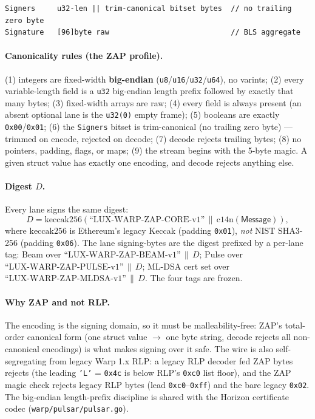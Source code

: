 \documentclass[11pt,a4paper]{article}
\begin{document}
\begin{lstlisting}
Signers     u32-len || trim-canonical bitset bytes  // no trailing zero byte
Signature   [96]byte raw                            // BLS aggregate
\end{lstlisting}

\paragraph{Canonicality rules (the ZAP profile).} (1) integers are fixed-width \textbf{big-endian} (\texttt{u8}/\texttt{u16}/\texttt{u32}/\texttt{u64}), no varints; (2) every variable-length field is a \texttt{u32} big-endian length prefix followed by exactly that many bytes; (3) fixed-width arrays are raw; (4) every field is always present (an absent optional lane is the \texttt{u32(0)} empty frame); (5) booleans are exactly \texttt{0x00}/\texttt{0x01}; (6) the \texttt{Signers} bitset is trim-canonical (no trailing zero byte) --- trimmed on encode, rejected on decode; (7) decode rejects trailing bytes; (8) no pointers, padding, flags, or maps; (9) the stream begins with the 5-byte magic. A given struct value has exactly one encoding, and decode rejects anything else.

\paragraph{Digest $D$.} Every lane signs the same digest:
\[
  D = \mathrm{keccak256}(\text{``LUX-WARP-ZAP-CORE-v1''} \,\|\, \mathrm{c14n}(\mathsf{Message})),
\]
where $\mathrm{keccak256}$ is Ethereum's legacy Keccak (padding \texttt{0x01}), \emph{not} NIST SHA3-256 (padding \texttt{0x06}). The lane signing-bytes are the digest prefixed by a per-lane tag: Beam over $\text{``LUX-WARP-ZAP-BEAM-v1''}\,\|\,D$; Pulse over $\text{``LUX-WARP-ZAP-PULSE-v1''}\,\|\,D$; ML-DSA cert set over $\text{``LUX-WARP-ZAP-MLDSA-v1''}\,\|\,D$. The four tags are frozen.

\paragraph{Why ZAP and not RLP.} The encoding is the signing domain, so it must be malleability-free: ZAP's total-order canonical form (one struct value $\to$ one byte string, decode rejects all non-canonical encodings) is what makes signing over it safe. The wire is also self-segregating from legacy Warp 1.x RLP: a legacy RLP decoder fed ZAP bytes rejects (the leading \texttt{'L'} = \texttt{0x4c} is below RLP's \texttt{0xc0} list floor), and the ZAP magic check rejects legacy RLP bytes (lead \texttt{0xc0}--\texttt{0xff}) and the bare legacy \texttt{0x02}. The big-endian length-prefix discipline is shared with the Horizon certificate codec (\texttt{warp/pulsar/pulsar.go}).
\end{document}
